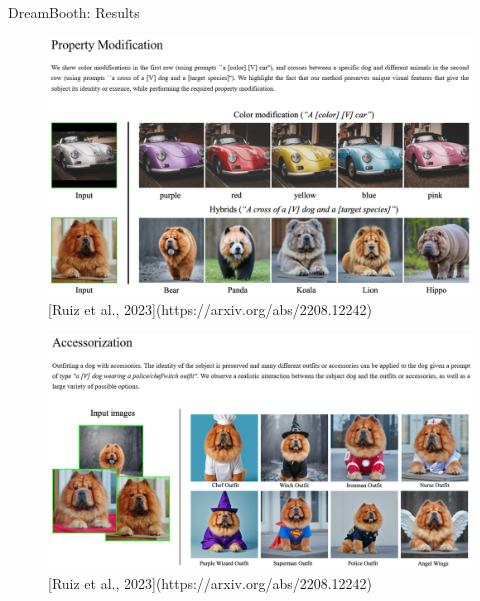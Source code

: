 \begin{frame}[allowframebreaks]{DreamBooth: Results}
\framebreak
\begin{figure}
    \centering
    \includegraphics[width=\linewidth,height=\textheight,keepaspectratio]{images/adv-img-gen/dreambooth-result-4.png}
    \small [Ruiz et al., 2023](https://arxiv.org/abs/2208.12242)
\end{figure}

\framebreak
\begin{figure}
    \centering
    \includegraphics[width=\linewidth,height=\textheight,keepaspectratio]{images/adv-img-gen/dreambooth-result-5.png}
    \small [Ruiz et al., 2023](https://arxiv.org/abs/2208.12242)
\end{figure}
\end{frame}